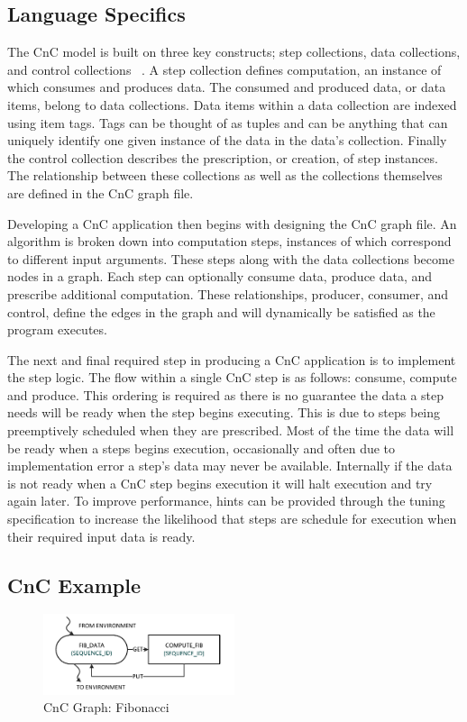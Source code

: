 \subsection{Language Specifics}
The CnC model is built on three key constructs; step collections, data collections, and control collections ~\cite{budimlicconcurrent}. A step collection defines computation, an instance of which consumes and produces data.  The consumed and produced data, or data items, belong to data collections.  Data items within a data collection are indexed using item tags.  Tags can be thought of as tuples and can be anything that can uniquely identify one given instance of the data in the data's collection.  Finally the control collection describes the prescription, or creation, of step instances.  The relationship between these collections as well as the collections themselves are defined in the CnC graph file.

Developing a CnC application then begins with designing the CnC graph file. An algorithm is broken down into computation steps, instances of which correspond to different input arguments. These steps along with the data collections become nodes in a graph. Each step can optionally consume data, produce data, and prescribe additional computation. These relationships, producer, consumer, and control, define the edges in the graph and will dynamically be satisfied as the program executes.

The next and final required step in producing a CnC application is to implement the step logic. The flow within a single CnC step is as follows: consume, compute and produce. This ordering is required as there is no guarantee the data a step needs will be ready when the step begins executing. This is due to steps being preemptively scheduled when they are prescribed.  Most of the time the data will be ready when a steps begins execution, occasionally and often due to implementation error a step’s data may never be available.  Internally if the data is not ready when a CnC step begins execution it will halt execution and try again later. To improve performance, hints can be provided through the tuning specification to increase the likelihood that steps are schedule for execution when their required input data is ready.

\subsection{CnC Example}

\begin{figure}[!htb]
  \centering
  \includegraphics[width=0.5\textwidth]{drawings/FibExample.pdf}
  \caption{CnC Graph: Fibonacci}
  \label{fig:fib_graph}
\end{figure}

